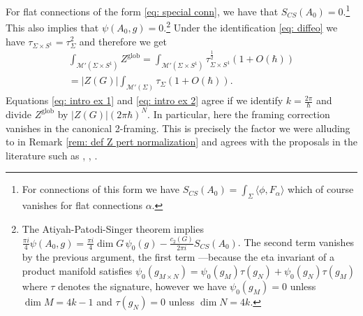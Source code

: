 \documentclass[11pt,a4paper]{amsart}
\theoremstyle{plain} %
\theoremstyle{definition}
\theoremstyle{remark}
\newcommand{\Z}{\mathbb{Z}}
\newcommand{\mr}{\mathrm}
\newcommand{\M}{\mathcal{M}}
\begin{document}
For flat connections of the form \eqref{eq: special conn}, we have that $S_{CS}(A_0)=0$.\footnote{For connections of this form we have $S_{CS}(A_0) = \int_\Sigma \langle \phi, F_\alpha\rangle$ which of course vanishes for flat connections $\alpha$. }
This also implies that $\psi(A_0,g) = 0$.\footnote{The Atiyah-Patodi-Singer theorem implies $\frac{\pi i}{4}\psi(A_0,g) = \frac{\pi i}{4}\dim G\, \psi_0(g) - \frac{c_2(G)}{2\pi i}S_{CS}(A_0)$. The second term vanishes by the previous argument, the first term ---because the eta invariant of a product manifold satisfies $\psi_0(g_{M\times N}) = \psi_0(g_M)\tau(g_N) + \psi_0(g_N)\tau(g_M)$ where $\tau$ denotes the signature, however we have $\psi_0(g_M) = 0$ unless $\dim M = 4k-1$ and $\tau(g_N) = 0$ unless $\dim N = 4k$.   } 
Under the identification \eqref{eq: diffeo} we have $\tau_{\Sigma \times S^1} = \tau_\Sigma^2$ and therefore we get
\begin{multline} \int_{\M'(\Sigma \times S^1)}Z^\mr{glob} = \int_{\M'(\Sigma\times S^1)}\tau_{\Sigma \times S^1}^\frac12(1 + O(\hbar)) \\
= 
 |Z(G)|\int_{\M'(\Sigma)}\tau_\Sigma (1 + O(\hbar)).
 \label{eq: intro ex 2}
\end{multline}%
Equations \eqref{eq: intro ex 1} and \eqref{eq: intro ex 2} agree if we identify $k = \frac{2\pi}{\hbar}$ and divide $Z^\mr{glob}$ by  $|Z(G)|(2\pi\hbar)^{N}$. In particular, here the framing correction vanishes in the canonical 2-framing. This is precisely the factor we were alluding to in Remark \ref{rem: def Z pert normalization} and agrees with the proposals in the literature such as \cite{Freed1991}, \cite{Rozansky1995}, \cite{Reshetikhin2010}.
\end{document}
